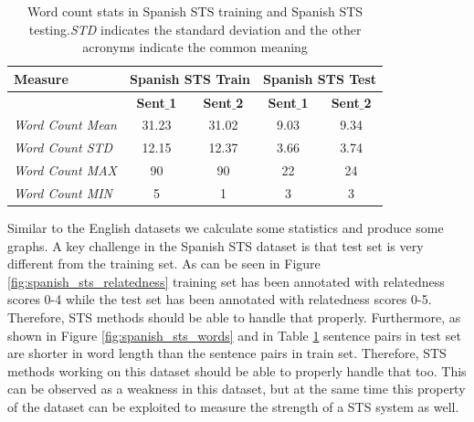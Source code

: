 \begin{enumerate}
\begin{table}
	\centering
	\begin{tabular}{l|cc|cc}
		\hline
		Measure   & \multicolumn{2}{c|}{Spanish STS Train} & \multicolumn{2}{c}{Spanish STS Test} \\
		\hline
		\multicolumn{1}{l|}{} & \textbf{Sent$\_$1} & \textbf{Sent$\_$2} & \textbf{Sent$\_$1} & \textbf{Sent$\_$2} \\
		\textit{Word Count Mean} & 31.23 & 31.02 & 9.03 & 9.34  \\
		\textit{Word Count STD} & 12.15 & 12.37 & 3.66 & 3.74  \\
		\textit{Word Count MAX} & 90 & 90 & 22 & 24  \\
		\textit{Word Count MIN} & 5 & 1 & 3 & 3  \\
		\hline
	\end{tabular}
	\caption[Word count stats in Spanish STS]{Word count stats in Spanish STS training and Spanish STS testing.\textit{STD} indicates the standard deviation and the other acronyms indicate the common meaning }
	\label{table:spanish_sts}
\end{table}

Similar to the English datasets we calculate some statistics and produce some graphs. A key challenge in the Spanish STS dataset is that test set is very different from the training set. As can be seen in Figure \ref{fig:spanish_sts_relatedness} training set has been annotated with relatedness scores 0-4 while the test set has been annotated with relatedness scores 0-5. Therefore, STS methods should be able to handle that properly. Furthermore, as shown in Figure \ref{fig:spanish_sts_words} and in Table \ref{table:spanish_sts} sentence pairs in test set are shorter in word length than the sentence pairs in train set. Therefore, STS methods working on this dataset should be able to properly handle that too. This can be observed as a weakness in this dataset, but at the same time this property of the dataset can be exploited to measure the strength of a STS system as well.

	


	
\end{enumerate}


